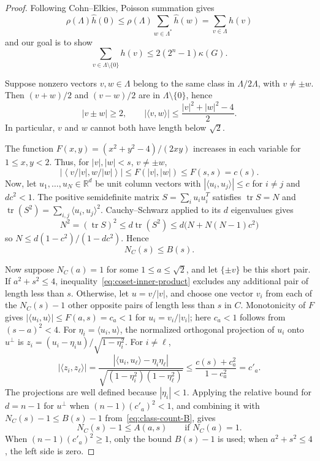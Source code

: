 \documentclass[11pt]{article}
\newcommand{\R}{\mathbb R}
\newcommand{\kap}{\kappa}
\begin{document}
\begin{proof}
Following Cohn--Elkies, Poisson summation gives 
\[
 \rho(\Lambda)\widehat h(0)
 \le\rho(\Lambda)\sum_{w\in \Lambda^*}\widehat h(w)
 =\sum_{v\in \Lambda}h(v)
\]
and our goal is to show 
\[\sum_{v\in \Lambda \setminus \{0\}}h(v) \leq   2(2^n-1)\kap(G).\]



Suppose nonzero vectors $v,w\in\Lambda$ belong to the same class in
$\Lambda/2\Lambda$, with $v\ne\pm w$. Then $(v+w)/2$ and $(v-w)/2$
are in $\Lambda\setminus\{0\}$, hence
\begin{equation}\label{eq:coset-inner-product}
 |v\pm w|\ge2,\qquad
 |\langle v,w\rangle|\le\frac{|v|^2+|w|^2-4}{2}.
\end{equation}
In particular, $v$ and $w$ cannot both have length below $\sqrt2$.

The function $F(x,y)=(x^2+y^2-4)/(2xy)$ increases in each variable for
$1\le x,y<2$. Thus, for $|v|,|w|<s$,  $v \neq \pm w$, 
\[
 \left|\left\langle{v}/{|v|},{w}/{|w|}\right\rangle\right|
 \le F(|v|,|w|)\le F(s,s)=c(s).
\]
Now, let $u_1,\ldots,u_N\in\R^d$ be unit column vectors
with $|\langle u_i,u_j\rangle|\le c$ for $i\ne j$ and $dc^2<1$.
The positive semidefinite matrix $S=\sum_i u_i u_i^T$ satisfies
$\operatorname{tr}S=N$ and
$\operatorname{tr}(S^2)=\sum_{i,j}\langle u_i,u_j\rangle^2$.
Cauchy--Schwarz applied to its $d$ eigenvalues gives
\[
 N^2=(\operatorname{tr}S)^2\le d\operatorname{tr}(S^2)
 \le d\bigl(N+N(N-1)c^2\bigr)
\]
so $N\le d(1-c^2)/(1-dc^2)$. Hence
\begin{equation}\label{eq:class-count-B}
 N_C(s)\le B(s).
\end{equation}

Now suppose $N_C(a)=1$ for some $1\le a\le\sqrt2$, and let
$\{\pm v\}$ be this short pair. If $a^2+s^2\le4$, inequality~\eqref{eq:coset-inner-product}
excludes any additional pair of length less than $s$. Otherwise, let $u=v/|v|$, and choose one vector
$v_i$ from each of the $N_C(s)-1$ other opposite pairs of length less
than $s$ in $C$.
Monotonicity of $F$ gives $|\langle u_i,u\rangle|\le F(a,s)=c_a<1$
for $u_i=v_i/|v_i|$; here $c_a<1$ follows from $(s-a)^2<4$. For $\eta_i=\langle u_i,u\rangle$, the
normalized orthogonal projection of $u_i$ onto $u^\perp$ is
$z_i=(u_i-\eta_i u)/\sqrt{1-\eta_i^2}$. For $i\ne\ell$,
\[
 |\langle z_i,z_\ell\rangle|
 =\frac{|\langle u_i,u_\ell\rangle-\eta_i\eta_\ell|}
 {\sqrt{(1-\eta_i^2)(1-\eta_\ell^2)}}
 \le\frac{c(s)+c_a^2}{1-c_a^2}=c'_a.
\]
The projections are well defined because $|\eta_i|<1$. Applying the
relative bound for $d = n-1$ for $u^\perp$ when
$(n-1)(c'_a)^2<1$, and combining it with
$N_C(s)-1\le B(s)-1$ from~\eqref{eq:class-count-B}, gives
\begin{equation}\label{eq:class-count-A}
 N_C(s)-1\le A(a,s)\qquad\text{if }N_C(a)=1.
\end{equation}
When $(n-1)(c'_a)^2\ge1$, only the bound $B(s)-1$ is used;
when $a^2+s^2\le4$, the left side is zero.


\end{proof}
\end{document}
